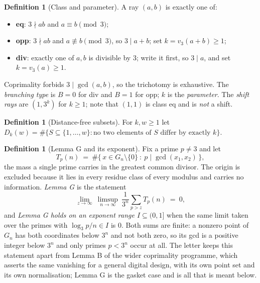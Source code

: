 \documentclass[11pt]{amsart}
\theoremstyle{definition}
\newtheorem{definition}[theorem]{Definition}
\theoremstyle{remark}
\begin{document}
\begin{definition}[Class and parameter]
\label{def:class}
A ray $(a,b)$ is exactly one of:
\begin{itemize}
  \item \textbf{eq}: $3 \nmid ab$ and $a \equiv b \pmod 3$;
  \item \textbf{opp}: $3 \nmid ab$ and $a \not\equiv b \pmod 3$, so $3 \mid a+b$; set $k = v_3(a+b) \ge 1$;
  \item \textbf{div}: exactly one of $a,b$ is divisible by $3$; write it first, so $3 \mid a$, and set $k = v_3(a) \ge 1$.
\end{itemize}
Coprimality forbids $3 \mid \gcd(a,b)$, so the trichotomy is exhaustive. The \emph{branching type} is $B = 0$ for div and $B = 1$ for opp; $k$ is the \emph{parameter}. The \emph{shift rays} are $(1, 3^k)$ for $k \ge 1$; note that $(1,1)$ is class eq and is \emph{not} a shift.
\end{definition}

\begin{definition}[Distance-free subsets]
\label{def:dk}
For $k, w \ge 1$ let $D_k(w) = \#\{S \subseteq \{1,\dots,w\} : \text{no two elements of } S \text{ differ by exactly } k\}$.
\end{definition}

\begin{definition}[Lemma G and its exponent]
\label{def:lemmag}
Fix a prime $p \ne 3$ and let
\[
  T_p(n) \ = \ \#\{\,x \in G_n \setminus \{0\} \ : \ p \mid \gcd(x_1,x_2)\,\},
\]
the mass a single prime carries in the greatest common divisor. The origin is excluded because it lies in every residue class of every modulus and carries no information. \emph{Lemma G} is the statement
\[
  \lim_{z \to \infty} \ \limsup_{n \to \infty} \ \frac{1}{3^n} \sum_{p > z} T_p(n) \ = \ 0 ,
\]
and \emph{Lemma G holds on an exponent range $I \subseteq (0,1]$} when the same limit taken over the primes with $\log_3 p / n \in I$ is $0$. Both sums are finite: a nonzero point of $G_n$ has both coordinates below $3^n$ and not both zero, so its gcd is a positive integer below $3^n$ and only primes $p < 3^n$ occur at all. The letter keeps this statement apart from Lemma B of the wider coprimality programme, which asserts the same vanishing for a general digital design, with its own point set and its own normalisation; Lemma G is the gasket case and is all that is meant below.
\end{definition}
\end{document}
